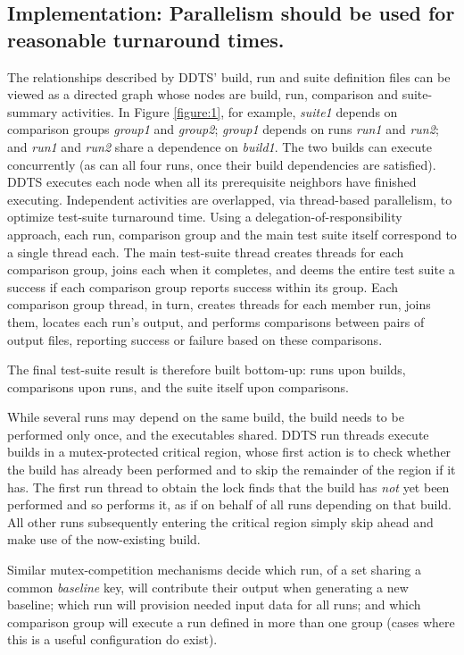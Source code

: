 \documentclass[conference]{IEEEtran}
\begin{document}
\subsection{Implementation: Parallelism should be used for reasonable turnaround times.}

The relationships described by DDTS' build, run and suite definition files can be viewed as a directed graph whose nodes are build, run, comparison and suite-summary activities. In Figure \ref{figure:1}, for example, \emph{suite1} depends on comparison groups \emph{group1} and \emph{group2}; \emph{group1} depends on runs \emph{run1} and \emph{run2}; and \emph{run1} and \emph{run2} share a dependence on \emph{build1}. The two builds can execute concurrently (as can all four runs, once their build dependencies are satisfied). DDTS executes each node when all its prerequisite neighbors have finished executing. Independent activities are overlapped, via thread-based parallelism, to optimize test-suite turnaround time. Using a delegation-of-responsibility approach, each run, comparison group and the main test suite itself correspond to a single thread each. The main test-suite thread creates threads for each comparison group, joins each when it completes, and deems the entire test suite a success if each comparison group reports success within its group. Each comparison group thread, in turn, creates threads for each member run, joins them, locates each run's output, and performs comparisons between pairs of output files, reporting success or failure based on these comparisons.

The final test-suite result is therefore built bottom-up: runs upon builds, comparisons upon runs, and the suite itself upon comparisons.

While several runs may depend on the same build, the build needs to be performed only once, and the executables shared. DDTS run threads execute builds in a mutex-protected critical region, whose first action is to check whether the build has already been performed and to skip the remainder of the region if it has. The first run thread to obtain the lock finds that the build has \emph{not} yet been performed and so performs it, as if on behalf of all runs depending on that build. All other runs subsequently entering the critical region simply skip ahead and make use of the now-existing build.

Similar mutex-competition mechanisms decide which run, of a set sharing a common \emph{baseline} key, will contribute their output when generating a new baseline; which run will provision needed input data for all runs; and which comparison group will execute a run defined in more than one group (cases where this is a useful configuration do exist).
\end{document}
